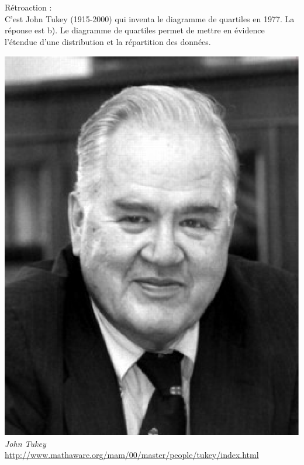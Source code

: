 \documentclass[letterpaper, 12pt]{article}
\begin{document}
R\'etroaction :\\
C'est John Tukey (1915-2000) qui inventa le diagramme de quartiles en 1977. La r\'eponse est b). Le diagramme de quartiles permet de mettre en \'evidence l'\'etendue d'une distribution et la r\'epartition des donn\'ees.
\begin{center}
\includegraphics[scale=0.35]{tukey.eps}\\
\emph{{\small John Tukey}}\\
\href{http://www.mathaware.org/mam/00/master/people/tukey/index.html}{http://www.mathaware.org/mam/00/master/people/tukey/index.html}\\[15mm]
\end{center}
\end{document}

